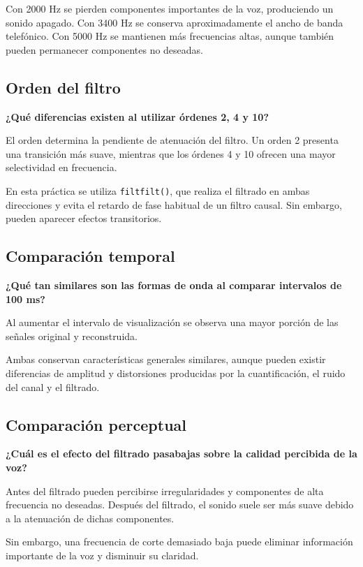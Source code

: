 \documentclass[12pt,a4paper]{article}
\begin{document}
Con 2000 Hz se pierden componentes importantes de la voz,
produciendo un sonido apagado. Con 3400 Hz se conserva
aproximadamente el ancho de banda telefónico. Con 5000 Hz
se mantienen más frecuencias altas, aunque también pueden
permanecer componentes no deseadas.

\subsection{Orden del filtro}

\textbf{¿Qué diferencias existen al utilizar órdenes
2, 4 y 10?}

El orden determina la pendiente de atenuación del filtro.
Un orden 2 presenta una transición más suave, mientras
que los órdenes 4 y 10 ofrecen una mayor selectividad
en frecuencia.

En esta práctica se utiliza \texttt{filtfilt()}, que
realiza el filtrado en ambas direcciones y evita el
retardo de fase habitual de un filtro causal. Sin embargo,
pueden aparecer efectos transitorios.

\subsection{Comparación temporal}

\textbf{¿Qué tan similares son las formas de onda al
comparar intervalos de 100 ms?}

Al aumentar el intervalo de visualización se observa una
mayor porción de las señales original y reconstruida.

Ambas conservan características generales similares,
aunque pueden existir diferencias de amplitud y distorsiones
producidas por la cuantificación, el ruido del canal y
el filtrado.

\subsection{Comparación perceptual}

\textbf{¿Cuál es el efecto del filtrado pasabajas sobre
la calidad percibida de la voz?}

Antes del filtrado pueden percibirse irregularidades y
componentes de alta frecuencia no deseadas. Después del
filtrado, el sonido suele ser más suave debido a la
atenuación de dichas componentes.

Sin embargo, una frecuencia de corte demasiado baja
puede eliminar información importante de la voz y
disminuir su claridad.
\end{document}
